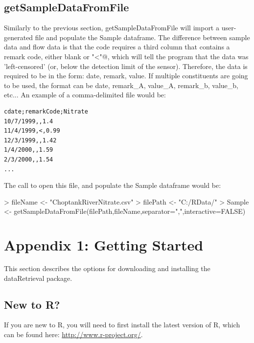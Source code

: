 \documentclass[a4paper,11pt]{article}
\begin{document}
\subsection{getSampleDataFromFile}
Similarly to the previous section, getSampleDataFromFile will import a user-generated file and populate the Sample dataframe. The difference between sample data and flow data is that the code requires a third column that contains a remark code, either blank or \verb@"<"@, which will tell the program that the data was 'left-censored' (or, below the detection limit of the sensor). Therefore, the data is required to be in the form: date, remark, value.  If multiple constituents are going to be used, the format can be date, remark\_A, value\_A, remark\_b, value\_b, etc... An example of a comma-delimited file would be:

\begin{verbatim}
cdate;remarkCode;Nitrate
10/7/1999,,1.4
11/4/1999,<,0.99
12/3/1999,,1.42
1/4/2000,,1.59
2/3/2000,,1.54
...
\end{verbatim}
The call to open this file, and populate the Sample dataframe would be:
\begin{Schunk}
\begin{Sinput}
> fileName <- "ChoptankRiverNitrate.csv"
> filePath <-  "C:/RData/"
> Sample <- getSampleDataFromFile(filePath,fileName,separator=",",interactive=FALSE)
\end{Sinput}
\end{Schunk}


\newpage
\appendix
\section{Appendix 1: Getting Started}
\label{sec:appendix1}
This section describes the options for downloading and installing the dataRetrieval package.

\subsection{New to R?}
If you are new to R, you will need to first install the latest version of R, which can be found here: \url{http://www.r-project.org/}.
\end{document}
